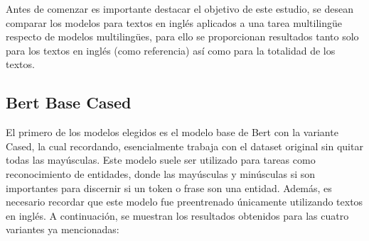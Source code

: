 Antes de comenzar es importante destacar el objetivo de este estudio, se desean comparar los modelos para textos en inglés aplicados a una tarea multilingüe respecto de modelos multilingües, para ello se proporcionan resultados tanto solo para los textos en inglés (como referencia) así como para la totalidad de los textos.

\subsection{Bert Base Cased}
El primero de los modelos elegidos es el modelo base de Bert con la variante Cased, la cual recordando, esencialmente trabaja con el dataset original sin quitar todas las mayúsculas. Este modelo suele ser utilizado para tareas como reconocimiento de entidades, donde las mayúsculas y minúsculas si son importantes para discernir si un token o frase son una entidad. Además, es necesario recordar que este modelo fue preentrenado únicamente utilizando textos en inglés. A continuación, se muestran los resultados obtenidos para las cuatro variantes ya mencionadas:

